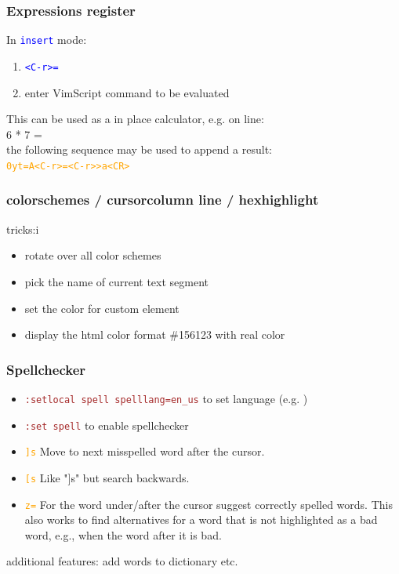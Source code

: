 \documentclass{beamer}
\newcommand{\vimmode}[1]{\texttt{#1}}
\newcommand{\viminsert}[1]{\texttt{\textcolor{blue}{#1}}}
\newcommand{\vimnormal}[1]{\texttt{\textcolor{orange}{#1}}}
\newcommand{\vimcommand}[1]{\texttt{\textcolor{brown}{#1}}}
\begin{document}
\begin{frame}
    \frametitle{Expressions register}
    In \viminsert{\vimmode{insert}} mode:
    \begin{enumerate}
        \item \viminsert{\textless{}C-r\textgreater{}=}
        \item enter VimScript command to be evaluated
    \end{enumerate}
    This can be used as a in place calculator, e.g. on line:\\
    \textrm{6 * 7 =}\\
    the following sequence may be used to append a result:\\
    \vimnormal{0yt=A\textless{}C-r\textgreater{}=\textless{}C-r\textgreater>a\textless{}CR\textgreater}
\end{frame}

\begin{frame}
    \frametitle{colorschemes / cursorcolumn line / hexhighlight}
    tricks:i
    \begin{itemize}
        \item    rotate over all color schemes
        \item pick the name of current text segment
        \item set the color for custom element
        \item display the html color format \#156123 with real color
    \end{itemize}
\end{frame}

\begin{frame}
    \frametitle{Spellchecker}
    \begin{itemize}
        \item \vimcommand{:setlocal spell spelllang=en\_us} to set language (e.g. )
        \item \vimcommand{:set spell} to enable spellchecker
        \item \vimnormal{]s} Move to next misspelled word after the cursor.
        \item \vimnormal{[s} Like "]s" but search backwards.
        \item \vimnormal{z=} For the word under/after the cursor suggest correctly spelled words. This also works to find alternatives for a word that is not highlighted as a bad word, e.g., when the word after it is bad.
    \end{itemize}
    additional features: add words to dictionary etc.
\end{frame}
\end{document}
